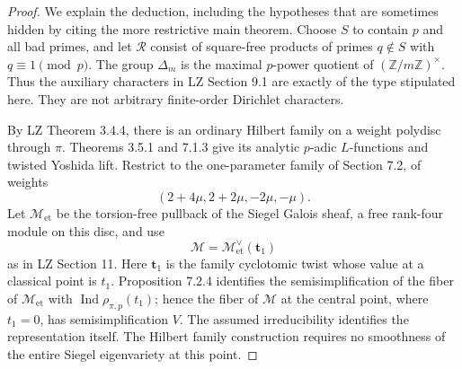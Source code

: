 \begin{proof}
We explain the deduction, including the hypotheses that are sometimes
hidden by citing the more restrictive main theorem.  Choose $S$ to
contain $p$ and all bad primes, and let $\mathcal R$ consist of
square-free products of primes $q\notin S$ with $q\equiv1\pmod p$.
The group $\Delta_m$ is the maximal $p$-power quotient of
$(\mathbb Z/m\mathbb Z)^\times$.  Thus the auxiliary characters in LZ
Section 9.1 are exactly of the type stipulated here.  They are not
arbitrary finite-order Dirichlet characters.

By LZ Theorem 3.4.4, there is an ordinary Hilbert family on a weight
polydisc through $\pi$.  Theorems 3.5.1 and 7.1.3 give its analytic
$p$-adic $L$-functions and twisted Yoshida lift.  Restrict to the
one-parameter family of Section 7.2, of weights
\[
 (2+4\mu,2+2\mu,-2\mu,-\mu).
\]
Let $\mathcal M_{\mathrm{et}}$ be the torsion-free pullback of the
Siegel Galois sheaf, a free rank-four module on this disc, and use
\[
 \mathcal M=\mathcal M_{\mathrm{et}}^{\vee}(\mathbf t_1)
\]
as in LZ Section 11.  Here $\mathbf t_1$ is the family cyclotomic
twist whose value at a classical point is $t_1$.  Proposition 7.2.4
identifies the semisimplification of the fiber of
$\mathcal M_{\mathrm{et}}$ with
$\operatorname{Ind}\rho_{\pi,p}(t_1)$; hence the fiber of
$\mathcal M$ at the central point, where $t_1=0$, has
semisimplification $V$.  The assumed irreducibility identifies the
representation itself.
The Hilbert family construction requires no smoothness of the entire
Siegel eigenvariety at this point.


\end{proof}
